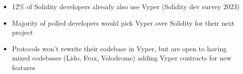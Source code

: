 \documentclass[aspectratio=169]{beamer}
\begin{document}
\begin{frame}
\begin{columns}[T,totalwidth=\textwidth]
\begin{column}{0.65\textwidth}
\begin{itemize}
				\item 12\% of Solidity developers already also use Vyper (Solidity dev survey 2023) 
				\vspace{0.7em}
				\item Majority of polled developers would pick Vyper over Solidity for their next project
				\vspace{0.7em}
				\item Protocols won't rewrite their codebase in Vyper, but are open to having mixed codebases (Lido, Frax, Velodrome) adding Vyper contracts for new features 
			\end{itemize}
		\end{column}
	\end{columns}
	\end{frame}

\end{document}
